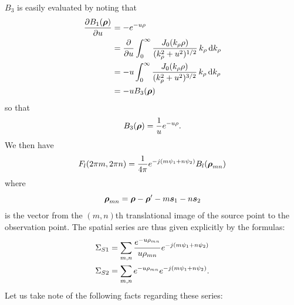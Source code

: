 $B_3$ is easily evaluated by noting that 
\begin{align}
  \frac{\partial B_1(\boldsymbol{\rho})}{\partial u} 
  &=
  - e^{-u{\rho}} \nonumber \\
  &= 
   \frac{\partial }{\partial u} \int_0^{\infty} 
  \frac{J_0(k_{\rho} {\rho})} 
  {(k_{\rho}^2 + u^2)^{1/2}} \, k_{\rho} \, \text{d} k_{\rho} 
  \nonumber \\
  &= 
  -u \int_0^{\infty} 
  \frac{J_0(k_{\rho} {\rho})} 
  {(k_{\rho}^2 + u^2)^{3/2}} \, k_{\rho} \, \text{d} k_{\rho} 
  \nonumber \\
  &= 
  -u B_3(\boldsymbol{\rho})
\end{align}
so that 
\begin{equation}
  B_3(\boldsymbol{\rho}) = \frac{1}{u} e^{-u {\rho}}.
\end{equation}
We then have
\begin{equation}
  F_l(2\pi m, 2\pi n) = \frac{1}{4\pi} e^{-j(m\psi_1 + n\psi_2)}
  B_l(\boldsymbol{\rho}_{mn})
\end{equation}
where
\begin{equation}
  \boldsymbol{\rho}_{mn} = \boldsymbol{\rho} - \boldsymbol{\rho}' - m\boldsymbol{s}_1 - n\boldsymbol{s}_2
\end{equation}
is the vector from the $(m,n)$th
translational image of the source point to the observation point.  
The spatial series are thus
given explicitly by the formulas:
\begin{subequations}
  \begin{align}
    \Sigma_{S1}
    &= 
    \sum_{m,n} 
    \frac{e^{-u\rho_{mn}}}{u\rho_{mn}} e^{-j(m\psi_1 + n\psi_2)}
    \\
    \Sigma_{S2}
    &= 
    \sum_{m,n} 
    e^{-u\rho_{mn}} e^{-j(m\psi_1 + n\psi_2)}.
  \end{align}
\end{subequations}
Let us take note of the following facts regarding these series:
